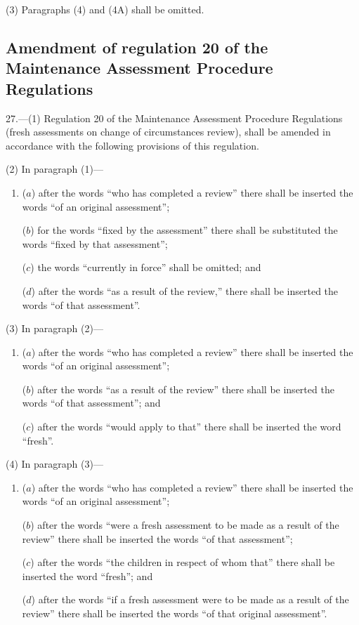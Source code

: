 \documentclass[12pt,a4paper]{article}
\begin{document}
(3) Paragraphs (4) and (4A) shall be omitted.

\subsection[27. Amendment of regulation 20 of the Maintenance Assessment Procedure Regulations]{Amendment of regulation 20 of the Maintenance Assessment Procedure Regulations}

27.—(1) Regulation 20 of the Maintenance Assessment Procedure Regulations (fresh assessments on change of circumstances review), shall be amended in accordance with the following provisions of this regulation.

(2) In paragraph (1)—
\begin{enumerate}\item[]
($a$) after the words “who has completed a review” there shall be inserted the words “of an original assessment”;

($b$) for the words “fixed by the assessment” there shall be substituted the words “fixed by that assessment”;

($c$) the words “currently in force” shall be omitted; and

($d$) after the words “as a result of the review,” there shall be inserted the words “of that assessment”.
\end{enumerate}

(3) In paragraph (2)—
\begin{enumerate}\item[]
($a$) after the words “who has completed a review” there shall be inserted the words “of an original assessment”;

($b$) after the words “as a result of the review” there shall be inserted the words “of that assessment”; and

($c$) after the words “would apply to that” there shall be inserted the word “fresh”.
\end{enumerate}

(4) In paragraph (3)—
\begin{enumerate}\item[]
($a$) after the words “who has completed a review” there shall be inserted the words “of an original assessment”;

($b$) after the words “were a fresh assessment to be made as a result of the review” there shall be inserted the words “of that assessment”;

($c$) after the words “the children in respect of whom that” there shall be inserted the word “fresh”; and

($d$) after the words “if a fresh assessment were to be made as a result of the review” there shall be inserted the words “of that original assessment”.
\end{enumerate}
\end{document}
